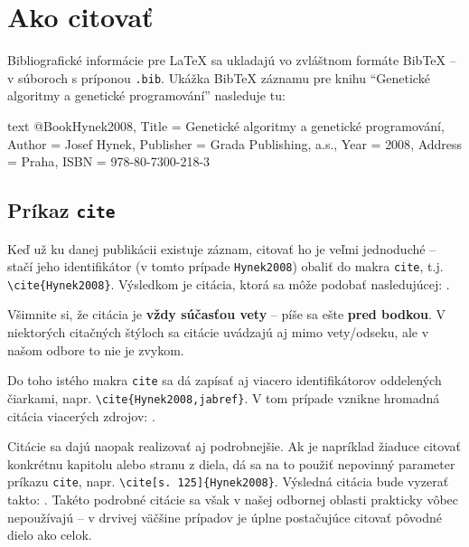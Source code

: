 \chapter{Ako citovať}

Bibliografické informácie pre LaTeX sa ukladajú vo zvláštnom formáte BibTeX -- v súboroch s príponou \texttt{.bib}. Ukážka BibTeX záznamu pre knihu \enquote{Genetické algoritmy a genetické programování} nasleduje tu:

\begin{inlinecode}[breaklines]{text}
@Book{Hynek2008,
  Title                    = {Genetické algoritmy a genetické programování},
  Author                   = {Josef Hynek},
  Publisher                = {Grada Publishing, a.s.},
  Year                     = {2008},
  Address                  = {Praha},
  ISBN                     = {978-80-7300-218-3}
}
\end{inlinecode}

\section{Príkaz \texttt{cite}}

Keď už ku danej publikácii existuje záznam, citovať ho je veľmi jednoduché -- stačí jeho identifikátor (v tomto prípade \texttt{Hynek2008}) obaliť do makra \texttt{cite}, t.j. \texttt{{\textbackslash}cite\{Hynek2008\}}. Výsledkom je citácia, ktorá sa môže podobať nasledujúcej: \cite{Hynek2008}.

Všimnite si, že citácia je \textbf{vždy súčasťou vety} -- píše sa ešte \textbf{pred bodkou}. V niektorých citačných štýloch sa citácie uvádzajú aj mimo vety/odseku, ale v našom odbore to nie je zvykom.

Do toho istého makra \texttt{cite} sa dá zapísať aj viacero identifikátorov oddelených čiarkami, napr. \texttt{{\textbackslash}cite\{Hynek2008,jabref\}}. V tom prípade vznikne hromadná citácia viacerých zdrojov: \cite{Hynek2008,jabref}.

Citácie sa dajú naopak realizovať aj podrobnejšie. Ak je napríklad žiaduce citovať konkrétnu kapitolu alebo stranu z diela, dá sa na to použiť nepovinný parameter príkazu \texttt{cite}, napr. \texttt{{\textbackslash}cite[s. 125]\{Hynek2008\}}. Výsledná citácia bude vyzerať takto: \cite[s. 125]{Hynek2008}. Takéto podrobné citácie sa však v našej odbornej oblasti prakticky vôbec nepoužívajú -- v drvivej väčšine prípadov je úplne postačujúce citovať pôvodné dielo ako celok.

